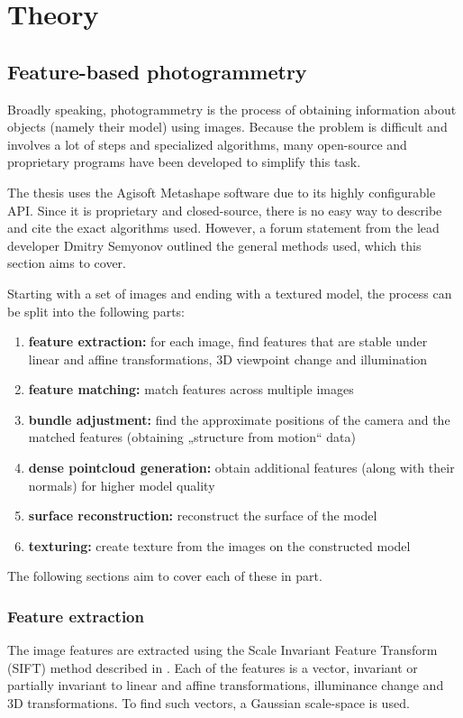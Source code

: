 \chapter{Theory}

\section{Feature-based photogrammetry}
Broadly speaking, photogrammetry is the process of obtaining information about objects (namely their model) using images.
Because the problem is difficult and involves a lot of steps and specialized algorithms, many open-source and proprietary programs have been developed to simplify this task.

The thesis uses the Agisoft Metashape software due to its highly configurable API.
Since it is proprietary and closed-source, there is no easy way to describe and cite the exact algorithms used.
However, a forum statement from the lead developer Dmitry Semyonov \parencite{metashapeForumPost} outlined the general methods used, which this section aims to cover.

Starting with a set of images and ending with a textured model, the process can be split into the following parts:

\begin{enumerate}
	\item \textbf{feature extraction:} for each image, find features that are stable under linear and affine transformations, 3D viewpoint change and illumination
	\item \textbf{feature matching:} match features across multiple images
	\item \textbf{bundle adjustment:} find the approximate positions of the camera and the matched features (obtaining „structure from motion“ data)
	\item \textbf{dense pointcloud generation:} obtain additional features (along with their normals) for higher model quality
	\item \textbf{surface reconstruction:} reconstruct the surface of the model
	\item \textbf{texturing:} create texture from the images on the constructed model
\end{enumerate}

The following sections aim to cover each of these in part.

\subsection{Feature extraction} \label{ch:fext}
The image features are extracted using the Scale Invariant Feature Transform (SIFT) method described in \citet{lowe1999object,lowe2004distinctive,snavely2008modeling}.
Each of the features is a vector, invariant or partially invariant to linear and affine transformations, illuminance change and 3D transformations.
To find such vectors, a Gaussian scale-space is used.

